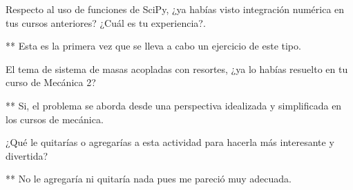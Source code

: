 \documentclass{article} %
\begin{document}
\vspace{0.5 cm}

Respecto al uso de funciones de SciPy, ¿ya habías visto integración numérica en tus cursos anteriores? ¿Cuál es tu experiencia?.

\vspace{0.5 cm}

** Esta es la primera vez que se lleva a cabo un ejercicio de este tipo. 

\vspace{0.5 cm}

El tema de sistema de masas acopladas con resortes, ¿ya lo habías resuelto en tu curso de Mecánica 2?  

\vspace{0.5 cm}

** Si, el problema se aborda desde una perspectiva idealizada y simplificada en los cursos de mecánica.

\vspace{0.5 cm}

¿Qué le quitarías o agregarías a esta actividad para hacerla más interesante y divertida? 

\vspace{0.5 cm}

** No le agregaría ni quitaría nada pues me pareció muy adecuada. 

\vspace{0.5 cm}
\end{document}
